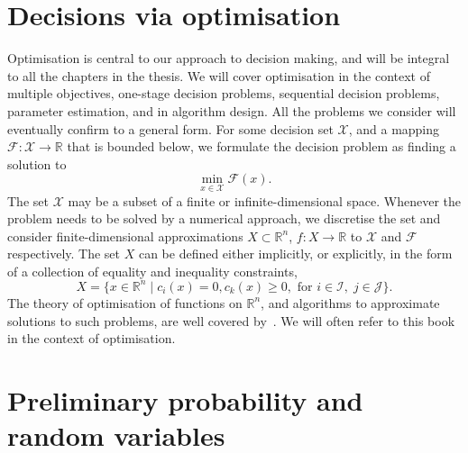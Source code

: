\documentclass[main.tex]{subfiles}
\begin{document}
\section{Decisions via optimisation}\label{sec:intro_decisions_through_optim}
Optimisation is central to our approach to decision making, and will
be integral to all the chapters in the thesis.
We will cover optimisation in the context of multiple objectives,
one-stage decision problems, sequential decision problems, parameter
estimation, and in algorithm design.
All the problems we consider will eventually confirm to a general
form. For some decision set $\mathcal{X}$, and a mapping
$\mathcal{F}:\mathcal{X}\to\mathbb{R}$ that is bounded below, we
formulate the decision problem as finding a solution to
\begin{equation}
  \min_{x\in\mathcal{X}}\mathcal{F}(x).
\end{equation}
The set $\mathcal{X}$ may be a subset of a finite or
infinite-dimensional space. Whenever the problem needs to be solved by
a numerical approach, we discretise the set and consider
finite-dimensional approximations $X\subset\mathbb{R}^n$, $f:X\to\mathbb{R}$ to
$\mathcal{X}$ and $\mathcal{F}$ respectively.
The set $X$ can be defined either implicitly, or explicitly, in the
form of a collection of equality and inequality constraints,
\begin{equation}
  X = \{x\in\mathbb{R}^n\mid c_i(x)=0, c_k(x)\geq 0, \text{ for }
  i\in\mathcal{I},\;j\in\mathcal{J}\}.
\end{equation}
The theory of optimisation of functions on $\mathbb{R}^n$, and
algorithms to approximate solutions to such problems, are well covered
by~\citet{nocedal2006numerical}. We will often refer to this book in
the context of optimisation.

\section{Preliminary probability and random variables}\label{sec:intro_prob_rvs}

\biblio{} %
\end{document}
